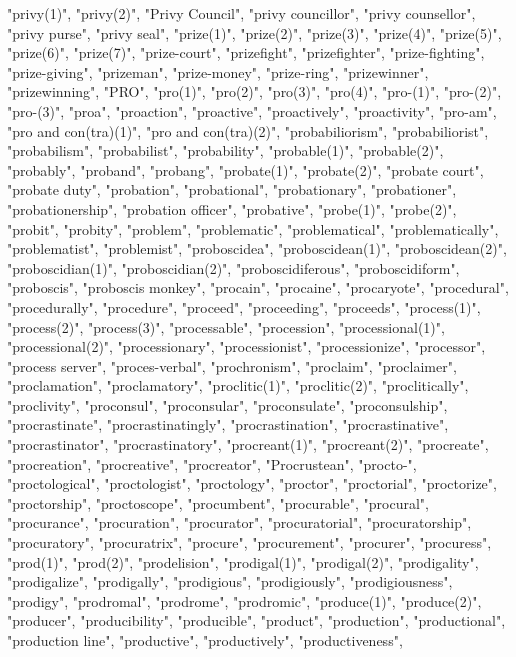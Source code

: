 "privy(1)",
"privy(2)",
"Privy Council",
"privy councillor",
"privy counsellor",
"privy purse",
"privy seal",
"prize(1)",
"prize(2)",
"prize(3)",
"prize(4)",
"prize(5)",
"prize(6)",
"prize(7)",
"prize-court",
"prizefight",
"prizefighter",
"prize-fighting",
"prize-giving",
"prizeman",
"prize-money",
"prize-ring",
"prizewinner",
"prizewinning",
"PRO",
"pro(1)",
"pro(2)",
"pro(3)",
"pro(4)",
"pro-(1)",
"pro-(2)",
"pro-(3)",
"proa",
"proaction",
"proactive",
"proactively",
"proactivity",
"pro-am",
"pro and con(tra)(1)",
"pro and con(tra)(2)",
"probabiliorism",
"probabiliorist",
"probabilism",
"probabilist",
"probability",
"probable(1)",
"probable(2)",
"probably",
"proband",
"probang",
"probate(1)",
"probate(2)",
"probate court",
"probate duty",
"probation",
"probational",
"probationary",
"probationer",
"probationership",
"probation officer",
"probative",
"probe(1)",
"probe(2)",
"probit",
"probity",
"problem",
"problematic",
"problematical",
"problematically",
"problematist",
"problemist",
"proboscidea",
"proboscidean(1)",
"proboscidean(2)",
"proboscidian(1)",
"proboscidian(2)",
"proboscidiferous",
"proboscidiform",
"proboscis",
"proboscis monkey",
"procain",
"procaine",
"procaryote",
"procedural",
"procedurally",
"procedure",
"proceed",
"proceeding",
"proceeds",
"process(1)",
"process(2)",
"process(3)",
"processable",
"procession",
"processional(1)",
"processional(2)",
"processionary",
"processionist",
"processionize",
"processor",
"process server",
"proces-verbal",
"prochronism",
"proclaim",
"proclaimer",
"proclamation",
"proclamatory",
"proclitic(1)",
"proclitic(2)",
"proclitically",
"proclivity",
"proconsul",
"proconsular",
"proconsulate",
"proconsulship",
"procrastinate",
"procrastinatingly",
"procrastination",
"procrastinative",
"procrastinator",
"procrastinatory",
"procreant(1)",
"procreant(2)",
"procreate",
"procreation",
"procreative",
"procreator",
"Procrustean",
"procto-",
"proctological",
"proctologist",
"proctology",
"proctor",
"proctorial",
"proctorize",
"proctorship",
"proctoscope",
"procumbent",
"procurable",
"procural",
"procurance",
"procuration",
"procurator",
"procuratorial",
"procuratorship",
"procuratory",
"procuratrix",
"procure",
"procurement",
"procurer",
"procuress",
"prod(1)",
"prod(2)",
"prodelision",
"prodigal(1)",
"prodigal(2)",
"prodigality",
"prodigalize",
"prodigally",
"prodigious",
"prodigiously",
"prodigiousness",
"prodigy",
"prodromal",
"prodrome",
"prodromic",
"produce(1)",
"produce(2)",
"producer",
"producibility",
"producible",
"product",
"production",
"productional",
"production line",
"productive",
"productively",
"productiveness",

